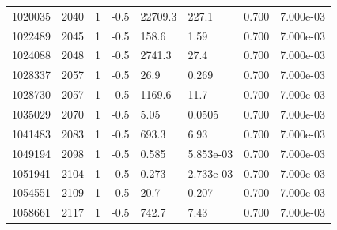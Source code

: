 \documentclass[preview]{standalone}
\begin{document}
{{{{{{{\begin{tabular}{L{1.2cm}C{1.2cm} C{0.3cm}C{0.5cm} C{1.4cm}C{1.4cm} C{1.4cm}C{1.4cm}}
  1020035  &  2040  & 1     & -0.5 &  22709.3  & 227.1  & 0.700 &  7.000e-03   \\ 
  1022489  &  2045  & 1     & -0.5 &  158.6  & 1.59  & 0.700 &  7.000e-03   \\ 
  1024088  &  2048  & 1     & -0.5 &  2741.3  & 27.4  & 0.700 &  7.000e-03   \\ 
  1028337  &  2057  & 1     & -0.5 &  26.9  & 0.269  & 0.700 &  7.000e-03   \\ 
  1028730  &  2057  & 1     & -0.5 &  1169.6  & 11.7  & 0.700 &  7.000e-03   \\ 
  1035029  &  2070  & 1     & -0.5 &  5.05  & 0.0505  & 0.700 &  7.000e-03   \\ 
  1041483  &  2083  & 1     & -0.5 &  693.3  & 6.93  & 0.700 &  7.000e-03   \\ 
  1049194  &  2098  & 1     & -0.5 &  0.585  & 5.853e-03  & 0.700 &  7.000e-03   \\ 
  1051941  &  2104  & 1     & -0.5 &  0.273  & 2.733e-03  & 0.700 &  7.000e-03   \\ 
  1054551  &  2109  & 1     & -0.5 &  20.7  & 0.207  & 0.700 &  7.000e-03   \\ 
  1058661  &  2117  & 1     & -0.5 &  742.7  & 7.43  & 0.700 &  7.000e-03   \\ 
\hline 
\end{tabular} 

}}}}}}}
\end{document}
